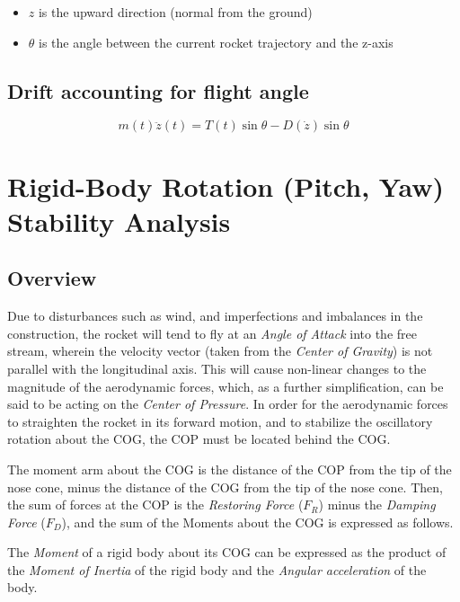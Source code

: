 \documentclass[]{article}
\providecommand{\tightlist}{%
  \setlength{\itemsep}{0pt}\setlength{\parskip}{0pt}}
\begin{document}
\begin{itemize}
\tightlist
\item
  \(z\) is the upward direction (normal from the ground)
\item
  \(\theta\) is the angle between the current rocket trajectory and the
  z-axis
\end{itemize}

\subsection{Drift accounting for flight
angle}\label{drift-accounting-for-flight-angle}

\begin{equation}
\label{eq_vertical_angle}
m(t) \ddot{z}(t) = T(t) \sin \theta - D(\dot{z}) \sin \theta 
\end{equation}

\section{Rigid-Body Rotation (Pitch, Yaw) Stability
Analysis}\label{rigid-body-rotation-pitch-yaw-stability-analysis}

\subsection{Overview}\label{overview-2}

Due to disturbances such as wind, and imperfections and imbalances in
the construction, the rocket will tend to fly at an \emph{Angle of
Attack} into the free stream, wherein the velocity vector (taken from
the \emph{Center of Gravity}) is not parallel with the longitudinal
axis. This will cause non-linear changes to the magnitude of the
aerodynamic forces, which, as a further simplification, can be said to
be acting on the \emph{Center of Pressure}. In order for the aerodynamic
forces to straighten the rocket in its forward motion, and to stabilize
the oscillatory rotation about the COG, the COP must be located behind
the COG.

The moment arm about the COG is the distance of the COP from the tip of
the nose cone, minus the distance of the COG from the tip of the nose
cone. Then, the sum of forces at the COP is the \emph{Restoring Force}
(\(F_R\)) minus the \emph{Damping Force} (\(F_D\)), and the sum of the
Moments about the COG is expressed as follows.

The \emph{Moment} of a rigid body about its COG can be expressed as the
product of the \emph{Moment of Inertia} of the rigid body and the
\emph{Angular acceleration} of the body.
\end{document}
